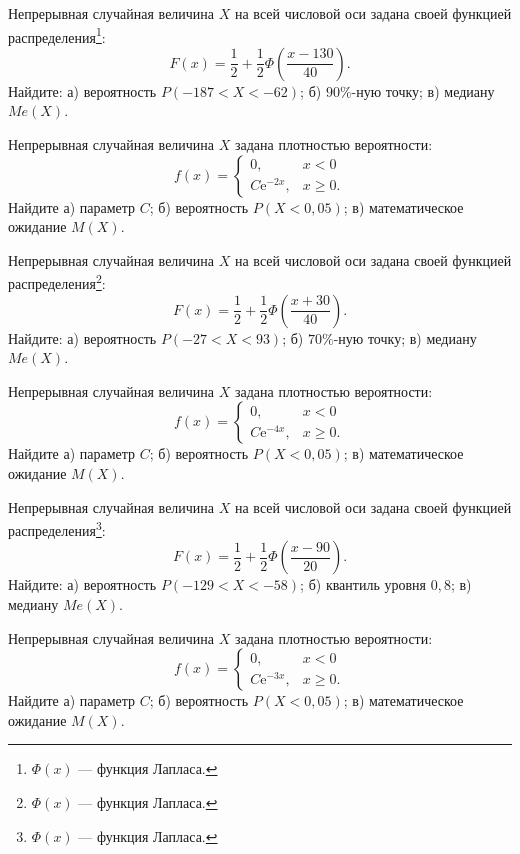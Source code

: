 \vfill

\newpage\setcounter{zad}{0}

\z Непрерывная случайная величина $X$ на всей числовой оси задана своей функцией распределения\footnote{$\Phi(x)$ --- функция Лапласа.}: $$ F(x) = \frac{1}{2} + \frac{1}{2}\Phi\left( \frac{x - 130}{40} \right). $$ Найдите: а) вероятность $P(-187 < X < -62)$; б) $90\%$-ную точку; в) медиану $Me(X)$.


\vfill

\z Непрерывная случайная величина $X$ задана плотностью вероятности: $$ f(x) = \begin{cases}0, & x < 0 \\ C\mathrm{e}^{-2x}, & x \geqslant 0.\end{cases} $$ Найдите а) параметр $C$; б) вероятность $P(X < 0{,}05)$; в) математическое ожидание $M(X)$.
 

\vfill

\newpage\setcounter{zad}{0}

\z Непрерывная случайная величина $X$ на всей числовой оси задана своей функцией распределения\footnote{$\Phi(x)$ --- функция Лапласа.}: $$ F(x) = \frac{1}{2} + \frac{1}{2}\Phi\left( \frac{x + 30}{40} \right). $$ Найдите: а) вероятность $P(-27 < X < 93)$; б) $70\%$-ную точку; в) медиану $Me(X)$.


\vfill

\z Непрерывная случайная величина $X$ задана плотностью вероятности: $$ f(x) = \begin{cases}0, & x < 0 \\ C\mathrm{e}^{-4x}, & x \geqslant 0.\end{cases} $$ Найдите а) параметр $C$; б) вероятность $P(X < 0{,}05)$; в) математическое ожидание $M(X)$.
 

\vfill

\newpage\setcounter{zad}{0}

\z Непрерывная случайная величина $X$ на всей числовой оси задана своей функцией распределения\footnote{$\Phi(x)$ --- функция Лапласа.}: $$ F(x) = \frac{1}{2} + \frac{1}{2}\Phi\left( \frac{x - 90}{20} \right). $$ Найдите: а) вероятность $P(-129 < X < -58)$; б) квантиль уровня $0{,}8$; в) медиану $Me(X)$.


\vfill

\z Непрерывная случайная величина $X$ задана плотностью вероятности: $$ f(x) = \begin{cases}0, & x < 0 \\ C\mathrm{e}^{-3x}, & x \geqslant 0.\end{cases} $$ Найдите а) параметр $C$; б) вероятность $P(X < 0{,}05)$; в) математическое ожидание $M(X)$.
 

